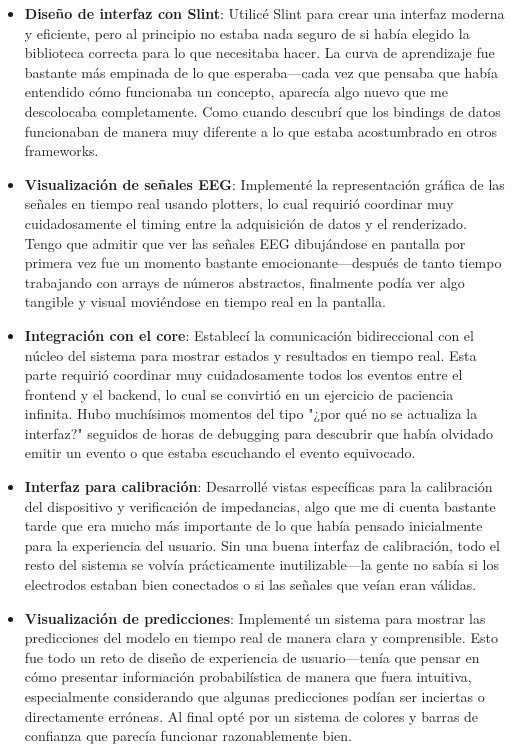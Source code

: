 \begin{itemize}
    \item \textbf{Diseño de interfaz con Slint}: Utilicé Slint para crear una interfaz moderna y eficiente, pero al principio no estaba nada seguro de si había elegido la biblioteca correcta para lo que necesitaba hacer. La curva de aprendizaje fue bastante más empinada de lo que esperaba—cada vez que pensaba que había entendido cómo funcionaba un concepto, aparecía algo nuevo que me descolocaba completamente. Como cuando descubrí que los bindings de datos funcionaban de manera muy diferente a lo que estaba acostumbrado en otros frameworks.
    
    \item \textbf{Visualización de señales EEG}: Implementé la representación gráfica de las señales en tiempo real usando plotters, lo cual requirió coordinar muy cuidadosamente el timing entre la adquisición de datos y el renderizado. Tengo que admitir que ver las señales EEG dibujándose en pantalla por primera vez fue un momento bastante emocionante—después de tanto tiempo trabajando con arrays de números abstractos, finalmente podía ver algo tangible y visual moviéndose en tiempo real en la pantalla.
    
    \item \textbf{Integración con el core}: Establecí la comunicación bidireccional con el núcleo del sistema para mostrar estados y resultados en tiempo real. Esta parte requirió coordinar muy cuidadosamente todos los eventos entre el frontend y el backend, lo cual se convirtió en un ejercicio de paciencia infinita. Hubo muchísimos momentos del tipo "¿por qué no se actualiza la interfaz?" seguidos de horas de debugging para descubrir que había olvidado emitir un evento o que estaba escuchando el evento equivocado.
    
    \item \textbf{Interfaz para calibración}: Desarrollé vistas específicas para la calibración del dispositivo y verificación de impedancias, algo que me di cuenta bastante tarde que era mucho más importante de lo que había pensado inicialmente para la experiencia del usuario. Sin una buena interfaz de calibración, todo el resto del sistema se volvía prácticamente inutilizable—la gente no sabía si los electrodos estaban bien conectados o si las señales que veían eran válidas.
    
    \item \textbf{Visualización de predicciones}: Implementé un sistema para mostrar las predicciones del modelo en tiempo real de manera clara y comprensible. Esto fue todo un reto de diseño de experiencia de usuario—tenía que pensar en cómo presentar información probabilística de manera que fuera intuitiva, especialmente considerando que algunas predicciones podían ser inciertas o directamente erróneas. Al final opté por un sistema de colores y barras de confianza que parecía funcionar razonablemente bien.
\end{itemize}


